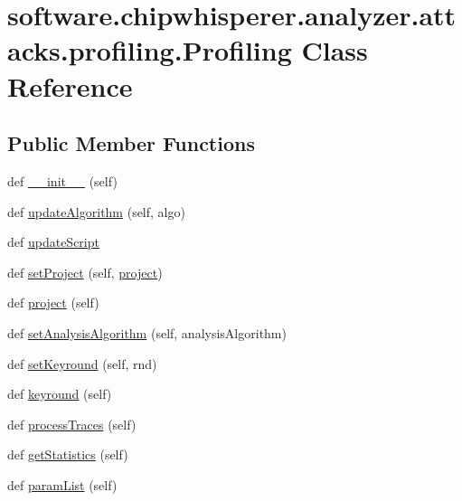 \hypertarget{classsoftware_1_1chipwhisperer_1_1analyzer_1_1attacks_1_1profiling_1_1Profiling}{}\section{software.\+chipwhisperer.\+analyzer.\+attacks.\+profiling.\+Profiling Class Reference}
\label{classsoftware_1_1chipwhisperer_1_1analyzer_1_1attacks_1_1profiling_1_1Profiling}
\subsection*{Public Member Functions}
\begin{DoxyCompactItemize}
\item 
def \hyperlink{classsoftware_1_1chipwhisperer_1_1analyzer_1_1attacks_1_1profiling_1_1Profiling_a19ddbad20e8662b4fc672b97f0ce1b9b}{\+\_\+\+\_\+init\+\_\+\+\_\+} (self)
\item 
def \hyperlink{classsoftware_1_1chipwhisperer_1_1analyzer_1_1attacks_1_1profiling_1_1Profiling_a752c7dfda87f7ca9c2af686953c3170b}{update\+Algorithm} (self, algo)
\item 
def \hyperlink{classsoftware_1_1chipwhisperer_1_1analyzer_1_1attacks_1_1profiling_1_1Profiling_a6ab79085111e40132ef81caec4cf4251}{update\+Script}
\item 
def \hyperlink{classsoftware_1_1chipwhisperer_1_1analyzer_1_1attacks_1_1profiling_1_1Profiling_a55ac1c6a2d2f2ca3e67050b1cc31fd95}{set\+Project} (self, \hyperlink{classsoftware_1_1chipwhisperer_1_1analyzer_1_1attacks_1_1profiling_1_1Profiling_a60f1ef9e385cd03d12214006f3160215}{project})
\item 
def \hyperlink{classsoftware_1_1chipwhisperer_1_1analyzer_1_1attacks_1_1profiling_1_1Profiling_a60f1ef9e385cd03d12214006f3160215}{project} (self)
\item 
def \hyperlink{classsoftware_1_1chipwhisperer_1_1analyzer_1_1attacks_1_1profiling_1_1Profiling_a40b114abe6e25a72035089824b66a018}{set\+Analysis\+Algorithm} (self, analysis\+Algorithm)
\item 
def \hyperlink{classsoftware_1_1chipwhisperer_1_1analyzer_1_1attacks_1_1profiling_1_1Profiling_ab183dea17b41991544a119f2e1fa4e2f}{set\+Keyround} (self, rnd)
\item 
def \hyperlink{classsoftware_1_1chipwhisperer_1_1analyzer_1_1attacks_1_1profiling_1_1Profiling_afd1094029230d49dd444f4a708be2dd8}{keyround} (self)
\item 
def \hyperlink{classsoftware_1_1chipwhisperer_1_1analyzer_1_1attacks_1_1profiling_1_1Profiling_a38c4ff6cc2be44c1f5656f866faa03d7}{process\+Traces} (self)
\item 
def \hyperlink{classsoftware_1_1chipwhisperer_1_1analyzer_1_1attacks_1_1profiling_1_1Profiling_a05523d24a79c50945db463f83fd3e4cc}{get\+Statistics} (self)
\item 
def \hyperlink{classsoftware_1_1chipwhisperer_1_1analyzer_1_1attacks_1_1profiling_1_1Profiling_ae07b2b6f931d42d61f2a8f65f50c6fd4}{param\+List} (self)
\end{DoxyCompactItemize}
